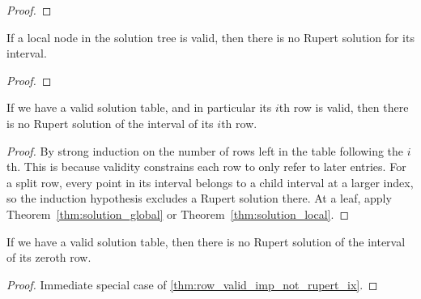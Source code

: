 \begin{proof}\leanok
{}
\end{proof}

\begin{theorem}
\label{thm:solution_local}
If a local node in the solution tree is valid, then there is no Rupert solution for its interval.
\leanok
{}
\end{theorem}

\begin{proof}\leanok
{}
\end{proof}


\begin{theorem}
\leanok
{}
\label{thm:row_valid_imp_not_rupert_ix}
If we have a valid solution table, and in particular its $i$th row is valid,
then there is no Rupert solution of the interval of its $i$th row.
\end{theorem}

\begin{proof}
\leanok
{}
By strong induction on the number of rows left in the table following the $i$th. This
is because validity constrains each row to only refer to later entries.
For a split row, every point in its interval belongs to a child interval at a
larger index, so the induction hypothesis excludes a Rupert solution there.
At a leaf, apply Theorem~\ref{thm:solution_global} or Theorem~\ref{thm:solution_local}.
\end{proof}

\begin{corollary}
\leanok
{}
\label{thm:row_valid_imp_not_rupert}
If we have a valid solution table, then there is no Rupert solution of the interval of its zeroth row.
\end{corollary}

\begin{proof}
\leanok
{}
Immediate special case of \cref{thm:row_valid_imp_not_rupert_ix}.
\end{proof}
